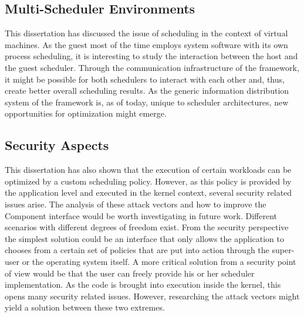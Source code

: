 \subsection{Multi-Scheduler Environments}

This dissertation has discussed the issue of scheduling in the context of virtual machines. As the guest most of the time employs system software with its own process scheduling, it is interesting to study the interaction between the host and the guest scheduler. Through the communication infrastructure of the \cobas{} framework, it might be possible for both schedulers to interact with each other and, thus, create better overall scheduling results. As the generic information distribution system of the \cobas{} framework is, as of today, unique to scheduler architectures, new opportunities for optimization might emerge.

\subsection{Security Aspects}

This dissertation has also shown that the execution of certain workloads can be optimized by a custom scheduling policy. However, as this policy is provided by the application level and executed in the kernel context, several security related issues arise. The analysis of these attack vectors and how to improve the \cobas{} Component interface would be worth investigating in future work. Different scenarios with different degrees of freedom exist. From the security perspective the simplest solution could be an interface that only allows the application to chooses from a certain set of policies that are put into action through the super-user or the operating system itself. A more critical solution from a security point of view would be that the user can freely provide his or her scheduler implementation. As the code is brought into execution inside the kernel, this opens many security related issues. However, researching the attack vectors might yield a solution between these two extremes.
